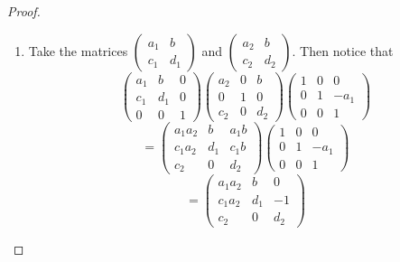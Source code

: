\documentclass[a4paper,10pt]{article}
\begin{document}
\begin{proof}
\begin{enumerate}
\item Take the matrices $\begin{pmatrix} a_{1} & b \\ c_{1} & d_{1}\end{pmatrix}$
and $\begin{pmatrix} a_{2} & b \\ c_{2} & d_{2}\end{pmatrix}$.
Then notice that $$\begin{pmatrix} a_{1} & b & 0 \\ c_{1} & d_{1}& 0\\ 0 & 0 & 1\end{pmatrix}
\begin{pmatrix} a_{2} & 0 & b \\ 0 & 1 & 0\\ c_{2} & 0 & d_{2}\end{pmatrix}
\begin{pmatrix} 1& 0 & 0 \\ 0 & 1 & -a_{1} \\ 0 & 0 & 1\end{pmatrix}$$
$$=\begin{pmatrix} a_{1}a_{2} & b & a_{1}b \\ c_{1}a_{2} & d_{1} & c_{1}b \\ c_{2} & 0 & d_{2} \end{pmatrix}
\begin{pmatrix} 1 & 0 & 0 \\ 0 & 1 & -a_{1} \\ 0 & 0 & 1 \end{pmatrix}$$
$$=\begin{pmatrix} a_{1}a_{2} & b & 0 \\ c_{1}a_{2} & d_{1} & -1 \\ c_{2} & 0 & d_{2}\end{pmatrix}$$


\end{enumerate}
\end{proof}
\end{document}
